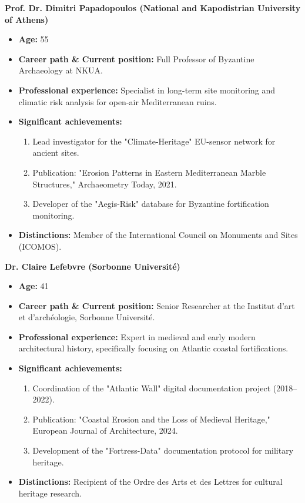 \textbf{Prof. Dr. Dimitri Papadopoulos (National and Kapodistrian University of Athens)}
\begin{itemize}
  \item \textbf{Age:} 55
  \item \textbf{Career path \& Current position:} Full Professor of Byzantine Archaeology at NKUA.
  \item \textbf{Professional experience:} Specialist in long-term site monitoring and climatic risk analysis for open-air Mediterranean ruins.
  \item \textbf{Significant achievements:}
    \begin{enumerate}
      \item Lead investigator for the "Climate-Heritage" EU-sensor network for ancient sites.
      \item Publication: "Erosion Patterns in Eastern Mediterranean Marble Structures," Archaeometry Today, 2021.
      \item Developer of the "Aegis-Risk" database for Byzantine fortification monitoring.
    \end{enumerate}
  \item \textbf{Distinctions:} Member of the International Council on Monuments and Sites (ICOMOS).
\end{itemize}

\textbf{Dr. Claire Lefebvre (Sorbonne Université)}
\begin{itemize}
  \item \textbf{Age:} 41
  \item \textbf{Career path \& Current position:} Senior Researcher at the Institut d'art et d'archéologie, Sorbonne Université.
  \item \textbf{Professional experience:} Expert in medieval and early modern architectural history, specifically focusing on Atlantic coastal fortifications.
  \item \textbf{Significant achievements:}
    \begin{enumerate}
      \item Coordination of the "Atlantic Wall" digital documentation project (2018–2022).
      \item Publication: "Coastal Erosion and the Loss of Medieval Heritage," European Journal of Architecture, 2024.
      \item Development of the "Fortress-Data" documentation protocol for military heritage.
    \end{enumerate}
  \item \textbf{Distinctions:} Recipient of the Ordre des Arts et des Lettres for cultural heritage research.
\end{itemize}
  
  